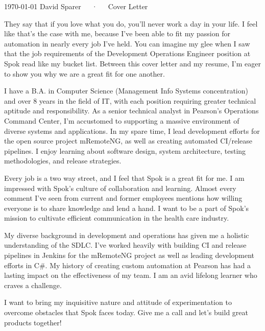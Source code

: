 \documentclass[11pt, a4paper]{cls/awesome-cv}
\begin{document}
	\makecvheader[R]

	\makecvfooter
	  {\today}
	  {David Sparer~~~·~~~Cover Letter}
	  {}

	\makelettertitle

	\begin{cvletter}

		They say that if you love what you do, you'll never work a day in your life. I feel like that's the case with me, because I've been able to fit my passion for automation in nearly every job I've held. You can imagine my glee when I saw that the job requirements of the Development Operations Engineer position at Spok read like my bucket list. Between this cover letter and my resume, I'm eager to show you why we are a great fit for one another.

		I have a B.A. in Computer Science (Management Info Systems concentration) and over 8 years in the field of IT, with each position requiring greater technical aptitude and responsibility. As a senior technical analyst in Pearson's Operations Command Center, I'm accustomed to supporting a massive environment of diverse systems and applications. In my spare time, I lead development efforts for the open source project mRemoteNG, as well as creating automated CI/release pipelines. I enjoy learning about software design, system architecture, testing methodologies, and release strategies.

		Every job is a two way street, and I feel that Spok is a great fit for me. I am impressed with Spok's culture of collaboration and learning. Almost every comment I've seen from current and former employees mentions how willing everyone is to share knowledge and lend a hand. I want to be a part of Spok's mission to cultivate efficient communication in the health care industry.

		My diverse background in development and operations has given me a holistic understanding of the SDLC. I've worked heavily with building CI and release pipelines in Jenkins for the mRemoteNG project as well as leading development efforts in C\#. My history of creating custom automation at Pearson has had a lasting impact on the effectiveness of my team. I am an avid lifelong learner who craves a challenge.


		I want to bring my inquisitive nature and attitude of experimentation to overcome obstacles that Spok faces today. Give me a call and let's build great products together!

	\end{cvletter}


	\makeletterclosing
\end{document}
